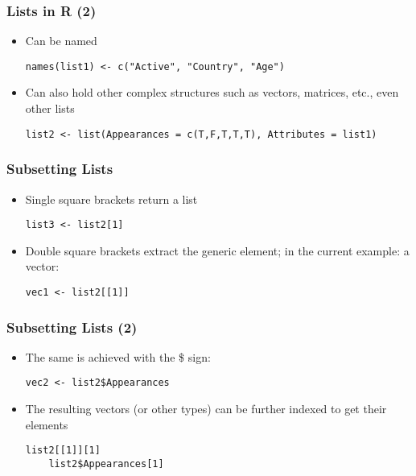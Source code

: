 \documentclass[10pt]{beamer}
\theoremstyle{definition}
\begin{document}
\begin{frame}[fragile]
\frametitle{Lists in R (2)}
\begin{itemize}
	\item Can be named
	\begin{lstlisting}[style = rstyle, breaklines]
	names(list1) <- c("Active", "Country", "Age")
	\end{lstlisting}

	\item Can also hold other complex structures such as vectors, matrices, etc., even other lists
	\begin{lstlisting}[style = rstyle, breaklines]
	list2 <- list(Appearances = c(T,F,T,T,T), Attributes = list1)
	\end{lstlisting}
\end{itemize}
\end{frame}

\begin{frame}[fragile]
\frametitle{Subsetting Lists}
\begin{itemize}
	\item Single square brackets return a list
	\begin{lstlisting}[style = rstyle, breaklines]
	list3 <- list2[1]
	\end{lstlisting}
	
	\item Double square brackets extract the generic element; in the current  example: a vector:
	\begin{lstlisting}[style = rstyle, breaklines]
	vec1 <- list2[[1]]
	\end{lstlisting}
\end{itemize}
\end{frame}

\begin{frame}[fragile]
\frametitle{Subsetting Lists (2)}
\begin{itemize}
	\item The same is achieved with the \$ sign:
	\begin{lstlisting}[style = rstyle, breaklines]
	vec2 <- list2$Appearances
	\end{lstlisting}

	\item The resulting vectors (or other types) can be further indexed to get their elements
	\begin{lstlisting}[style = rstyle, breaklines]
	list2[[1]][1]
	list2$Appearances[1]
	\end{lstlisting}
\end{itemize}
\end{frame}
\end{document}
